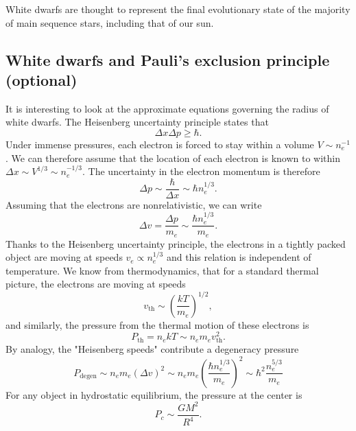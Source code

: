 \documentclass[a4paper,12pt]{article}
\theoremstyle{remark}
\newcommand{\mrm}[1]{\mathrm{#1}}
\renewcommand{\=}[1]{\stackrel{#1}{=}} %
\theoremstyle{plain}
\theoremstyle{definition}
\begin{document}
White dwarfs are thought to represent the final evolutionary state of the majority of main sequence stars, including that of our sun. 

\subsection{White dwarfs and Pauli's exclusion principle (optional)}
It is interesting to look at the approximate equations governing the radius of white dwarfs. The Heisenberg uncertainty principle states that 
\begin{equation}
\Delta x \Delta p \geq \hbar.
\end{equation}
Under immense pressures, each electron is forced to stay within a volume $V \sim n_e^{-1}$. We can therefore assume that the location of each electron is known to within~$\Delta x \sim V^{1/3} \sim n_e^{-1/3}$. The uncertainty in the electron momentum is therefore 
\begin{equation}
\Delta p \sim \frac{\hbar}{\Delta x} \sim \hbar n_e^{1/3}.
\end{equation}
Assuming that the electrons are nonrelativistic, we can write 
\begin{equation}
\Delta v = \frac{\Delta p}{m_e} \sim \frac{\hbar n_e^{1/3}}{m_e}.
\end{equation}
Thanks to the Heisenberg uncertainty principle, the electrons in a tightly packed object are moving at speeds $v_e \propto n_e ^{1/3}$ and this relation is independent of temperature. We know from thermodynamics, that for a standard thermal picture, the electrons are moving at speeds
\begin{equation}
v_\mrm{th} \sim \left(\frac{kT}{m_e} \right)^{1/2},
\end{equation}
and similarly, the pressure from the thermal motion of these electrons is 
\begin{equation}
P_\mrm{th} = n_e k T \sim n_e m_e v^2_\mrm{th}.
\end{equation}
By analogy, the "Heisenberg speeds" contribute a degeneracy pressure 
\begin{equation}
P_\mrm{degen} \sim n_e m_e (\Delta v)^2 \sim n_e m_e \left( \frac{\hbar n_e^{1/3}}{m_e} \right)^2 \sim \hbar^2 \frac{n_e ^{5/3}}{m_e}
\end{equation}
For any object in hydrostatic equilibrium, the pressure at the center is 
\begin{equation}
P_c \sim \frac{GM^2}{R^4}.
\label{eq:heq}
\end{equation}
\end{document}
